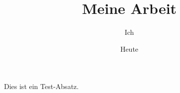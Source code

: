 \documentclass[titlepage,twoside]{article}
\begin{document}
  \begin{titlepage}
    \title{Meine Arbeit}
    \author{Ich}
    \date{Heute}

    \maketitle
  \end{titlepage}

  \null \thispagestyle{empty} \newpage

  \setcounter{page}{1}
  
  Dies ist ein Test-Absatz.
\end{document}

